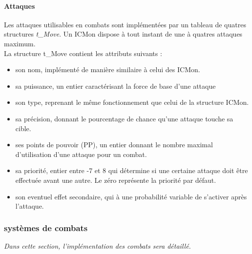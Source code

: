 \documentclass[12pt,a4paper, twoside]{article}
\begin{document}
        \paragraph{Attaques} Les attaques utilisables en combats sont implémentées par un tableau de quatres structures \emph{t\_Move}. Un ICMon dispose à tout instant de une à quatres attaques maximum.\\
        La structure t\_Move contient les attributs suivants :
        \begin{itemize}
            \item son nom, implémenté de manière similaire à celui des ICMon.
            \item sa puissance, un entier caractérisant la force de base d'une attaque
            \item son type, reprenant le même fonctionnement que celui de la structure ICMon.
            \item sa précision, donnant le pourcentage de chance qu'une attaque touche sa cible.
            \item ses points de pouvoir (PP), un entier donnant le nombre maximal d'utilisation d'une attaque pour un combat.
            \item sa priorité, entier entre -7 et 8 qui détermine si une certaine attaque doit être effectuée avant une autre. Le zéro représente la priorité par défaut.
            \item son eventuel effet secondaire, qui à une probabilité variable de s'activer après l'attaque.
        \end{itemize}  
    \subsubsection{systèmes de combats}
        \emph{Dans cette section, l'implémentation des combats sera détaillé.}
\end{document}
